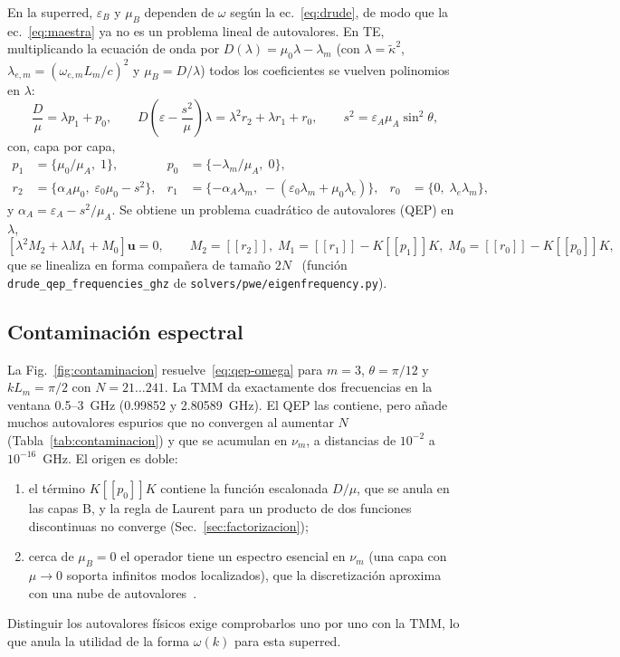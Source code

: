 \documentclass[11pt,a4paper]{article}
\newcommand{\toep}[1]{[\![#1]\!]}
\newcommand{\code}[1]{\texttt{#1}}
\begin{document}
En la superred, $\varepsilon_B$ y $\mu_B$ dependen de $\omega$ según la
ec.~\eqref{eq:drude}, de modo que la ec.~\eqref{eq:maestra} ya no es un problema
lineal de autovalores. En TE, multiplicando la ecuación de onda por
$D(\lambda)=\mu_0\lambda-\lambda_m$ (con $\lambda=\tilde\kappa^2$,
$\lambda_{e,m}=(\omega_{e,m}L_m/c)^2$ y $\mu_B=D/\lambda$) todos los coeficientes
se vuelven polinomios en $\lambda$:
\begin{equation}
\frac{D}{\mu}=\lambda p_1+p_0,\qquad
D\left(\varepsilon-\frac{s^2}{\mu}\right)\lambda=\lambda^2r_2+\lambda r_1+r_0,
\qquad s^2=\varepsilon_A\mu_A\sin^2\theta,
\end{equation}
con, capa por capa,
\begin{align}
p_1&=\{\mu_0/\mu_A,\;1\}, & p_0&=\{-\lambda_m/\mu_A,\;0\},\\
r_2&=\{\alpha_A\mu_0,\;\varepsilon_0\mu_0-s^2\}, &
r_1&=\{-\alpha_A\lambda_m,\;-(\varepsilon_0\lambda_m+\mu_0\lambda_e)\}, &
r_0&=\{0,\;\lambda_e\lambda_m\},
\end{align}
y $\alpha_A=\varepsilon_A-s^2/\mu_A$. Se obtiene un problema cuadrático de
autovalores (QEP) en $\lambda$,
\begin{equation}
\left[\lambda^2M_2+\lambda M_1+M_0\right]\mathbf u=0,\qquad
M_2=\toep{r_2},\;M_1=\toep{r_1}-K\toep{p_1}K,\;M_0=\toep{r_0}-K\toep{p_0}K,
\label{eq:qep-omega}
\end{equation}
que se linealiza en forma compañera de tamaño $2N$~\cite{tisseur}
(función \code{drude\_qep\_frequencies\_ghz} de \code{solvers/pwe/eigenfrequency.py}).

\subsection{Contaminación espectral}

La Fig.~\ref{fig:contaminacion} resuelve~\eqref{eq:qep-omega} para $m=3$,
$\theta=\pi/12$ y $kL_m=\pi/2$ con $N=21\dots241$. La TMM da exactamente dos
frecuencias en la ventana 0.5--3~GHz (0.99852 y 2.80589~GHz). El QEP las
contiene, pero añade muchos autovalores espurios que no convergen al aumentar
$N$ (Tabla~\ref{tab:contaminacion}) y que se acumulan en $\nu_m$, a distancias
de $10^{-2}$ a $10^{-16}$~GHz. El origen es doble:
\begin{enumerate}[label=(\roman*)]
\item el término $K\toep{p_0}K$ contiene la función escalonada $D/\mu$, que se
anula en las capas B, y la regla de Laurent para un producto de dos funciones
discontinuas no converge (Sec.~\ref{sec:factorizacion});
\item cerca de $\mu_B=0$ el operador tiene un espectro esencial en $\nu_m$ (una
capa con $\mu\to0$ soporta infinitos modos localizados), que la discretización
aproxima con una nube de autovalores~\cite{tip}.
\end{enumerate}
Distinguir los autovalores físicos exige comprobarlos uno por uno con la TMM, lo
que anula la utilidad de la forma $\omega(k)$ para esta superred.
\end{document}
